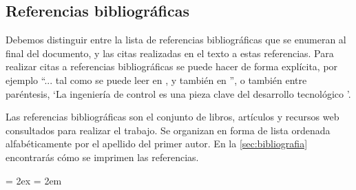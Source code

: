 \documentclass[11pt]{article}
\begin{document}
\subsection{Referencias bibliográficas}

Debemos distinguir entre la lista de referencias bibliográficas que se enumeran al final del documento, y las citas realizadas en el texto a estas referencias. Para realizar citas a referencias bibliográficas se puede hacer de forma explícita, por ejemplo ``... tal como se puede leer en \textcite{aastrom1973self}, y también en \textcite{ogata1996}'', o también entre paréntesis, \enquote*{La ingeniería de control es una pieza clave del desarrollo tecnológico \parencite{phillips1995}}.

Las referencias bibliográficas son el conjunto de libros, artículos y recursos web consultados para realizar el trabajo. Se organizan en forma de lista ordenada alfabéticamente por el apellido del primer autor. En la \autoref{sec:bibliografia} encontrarás cómo se imprimen las referencias.


\bibitemsep = 2ex
\bibhang = 2em

\printbibliography[heading=bibnumbered, title=\bibname, label=sec:bibliografia]

\end{document}
